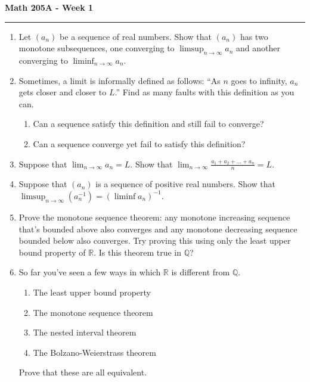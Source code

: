 \documentclass[11pt,letterpaper]{report}
\newcommand{\reals}{\mathbb{R}}
\newcommand{\rationals}{\mathbb{Q}}
\begin{document}
\begin{center}
{\bf \Large Math 205A - Week 1}
\vspace{0.2cm}
\hrule
\end{center}

\begin{enumerate}
	\item Let $(a_n)$ be a sequence of real numbers. Show that $(a_n)$ has two monotone subsequences, one converging to $\limsup_{n\to \infty}a_n$ and another converging to $\liminf_{n\to \infty}a_n$.

	\vfill

	\item Sometimes, a limit is informally defined as follows: ``As $n$ goes to infinity, $a_n$ gets closer and closer to $L$.'' Find as many faults with this definition as you can.
	\begin{enumerate}
		\item Can a sequence satisfy this definition and still fail to converge?
		\item Can a sequence converge yet fail to satisfy this definition?
	\end{enumerate}

	\vfill

	\item Suppose that $\lim_{n\to \infty}a_n = L$. Show that $\lim_{n\to \infty}\frac{a_1 + a_2 + \ldots +a_n}{n} = L$.

	\vfill

	\item Suppose that $(a_n)$ is a sequence of positive real numbers. Show that $\limsup_{n\to \infty}(a_n^{-1}) = (\liminf a_n)^{-1}$.

	\vfill

	\item Prove the monotone sequence theorem: any monotone increasing sequence that's bounded above also converges and any monotone decreasing sequence bounded below also converges. Try proving this using only the least upper bound property of $\reals$. Is this theorem true in $\rationals$?

	\vfill

	\item So far you've seen a few ways in which $\reals$ is different from $\rationals$.
	\begin{enumerate}
		\item The least upper bound property
		\item The monotone sequence theorem
		\item The nested interval theorem
		\item The Bolzano-Weierstrass theorem
	\end{enumerate}
	Prove that these are all equivalent.

	\vfill
\end{enumerate}
\end{document}
